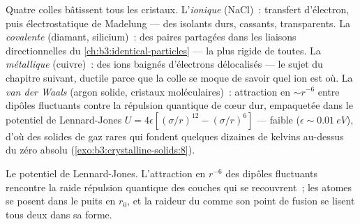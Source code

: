 \begin{remark}\label{rem:b3:crystalline-solids:bonds}
Quatre colles bâtissent tous les cristaux. L'\emph{ionique} (NaCl)~:
transfert d'électron, puis électrostatique de Madelung --- des
isolants durs, cassants, transparents. La \emph{covalente} (diamant,
silicium)~: des paires partagées dans les liaisons directionnelles du
\cref{ch:b3:identical-particles} --- la plus rigide de toutes. La
\emph{métallique} (cuivre)~: des ions baignés d'électrons délocalisés
--- le sujet du chapitre suivant, ductile parce que la colle se moque
de savoir quel ion est où. La \emph{van der Waals} (argon solide,
cristaux moléculaires)~: attraction en $\sim r^{-6}$ entre dipôles
fluctuants contre la répulsion quantique de cœur dur, empaquetée dans
le potentiel de Lennard-Jones
$U = 4\epsilon[(\sigma/r)^{12} - (\sigma/r)^6]$ --- faible
($\epsilon \sim \qty{0.01}{eV}$), d'où des solides de gaz rares qui
fondent quelques dizaines de kelvins au-dessus du zéro absolu
(\cref{exo:b3:crystalline-solids:8}).
\end{remark}

\begin{omfigure}

{\small Le potentiel de Lennard-Jones. L'attraction en $r^{-6}$ des
dipôles fluctuants rencontre la raide répulsion quantique des couches
qui se recouvrent~; les atomes se posent dans le puits en $r_0$, et la
raideur du  comme son point de fusion se lisent tous deux dans
sa forme.}
\end{omfigure}

